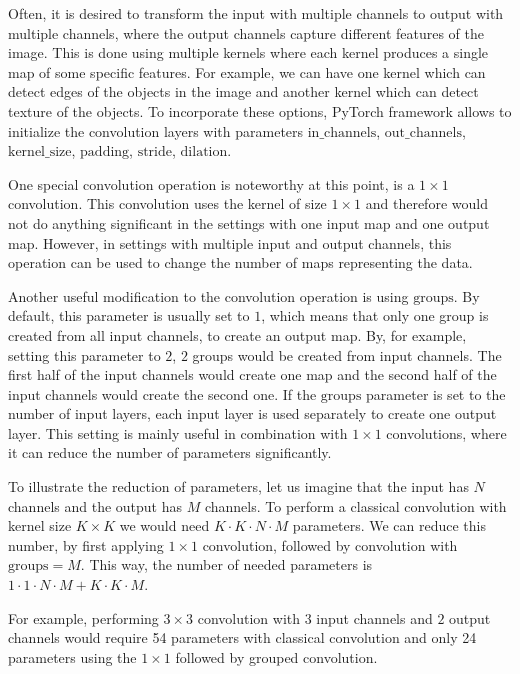 Often, it is desired to transform the input with multiple channels to output with multiple channels, where the output channels capture different features of the image.
This is done using multiple kernels where each kernel produces a single map of some specific features.
For example, we can have one kernel which can detect edges of the objects in the image and another kernel which can detect texture of the objects.
To incorporate these options, PyTorch framework allows to initialize the convolution layers with parameters $\text{in\_channels}$, $\text{out\_channels}$, $\text{kernel\_size}$, $\text{padding}$, $\text{stride}$, $\text{dilation}$.

One special convolution operation is noteworthy at this point, %
is a $1 \times 1$ convolution. 
This convolution uses the kernel of size $1 \times 1$ and therefore would not do anything significant in the settings with one input map and one output map.
However, in settings with multiple input and output channels, this operation can be used to change the number of maps representing the data.

Another useful modification to the convolution operation is using $\text{groups}$.
By default, this parameter is usually set to $1$, which means that only one group is created from all input channels, to create an output map.
By, for example, setting this parameter to $2$, $2$ groups would be created from input channels.
The first half of the input channels would create one map and the second half of the input channels would create the second one.
If the $\text{groups}$ parameter is set to the number of input layers, each input layer is used separately to create one output layer.
This setting is mainly useful in combination with $1 \times 1$ convolutions, where it can reduce the number of parameters significantly. 

To illustrate the reduction of parameters, let us imagine that the input has $N$ channels and the output has $M$ channels.
To perform a classical convolution with kernel size $K \times K$ we would need $K \cdot K \cdot N \cdot M$ parameters.
We can reduce this number, by first applying $1 \times 1$ convolution, followed by convolution with $\text{groups} = M$.
This way, the number of needed parameters is $1 \cdot 1 \cdot N \cdot M + K \cdot K \cdot M$.

For example, performing $3 \times 3$ convolution with $3$ input channels and $2$ output channels would require 54 parameters with classical convolution and only 24 parameters using the $1 \times 1$ followed by grouped convolution.


